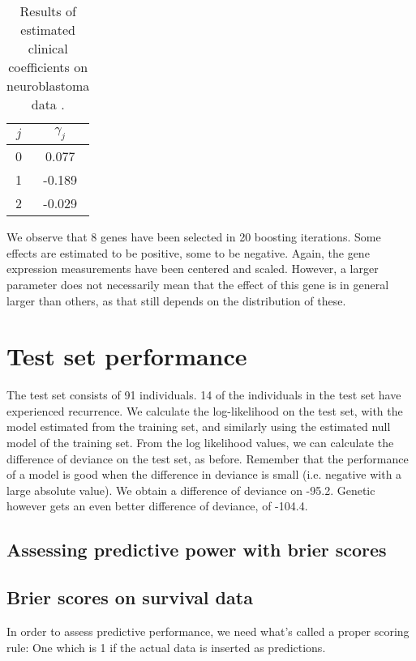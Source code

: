 \begin{table}
\caption{Results of estimated clinical coefficients on neuroblastoma data \citep{oberthuer-data}.}
\label{tab:oberthuer-gamma}
\centering
\begin{tabular}{cc}
\toprule
$j$ & $\gamma_j$\\
\hline
0 &  0.077  \\
1 &  -0.189 \\
2 &   -0.029 \\
\bottomrule
\end{tabular}
\end{table}

We observe that 8 genes have been selected in 20 boosting iterations.
Some effects are estimated to be positive, some to be negative.
Again, the gene expression measurements have been centered and scaled.
However, a larger parameter does not necessarily mean that the effect of this gene is in general larger than others, as that still depends on the distribution of these.



\section{Test set performance}
The test set consists of 91 individuals.
14 of the individuals in the test set have experienced recurrence.
We calculate the log-likelihood on the test set, with the model estimated from the training set, and similarly using the estimated null model of the training set.
From the log likelihood values, we can calculate the difference of deviance on the test set, as before.
Remember that the performance of a model is good when the difference in deviance is small (i.e. negative with a large absolute value).
We obtain a difference of deviance on -95.2.
Genetic however gets an even better difference of deviance, of -104.4.

\subsection{Assessing predictive power with brier scores}
\subsection{Brier scores on survival data}
In order to assess predictive performance, we need what's called a proper scoring rule: One which is 1 if the actual data is inserted as predictions.

